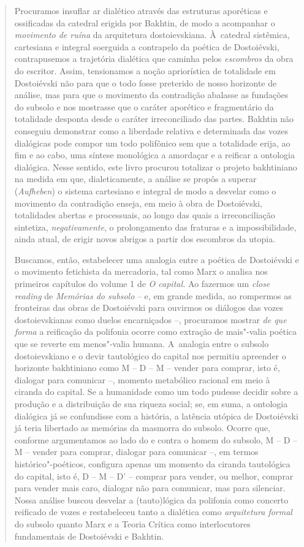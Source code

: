{\begin{quote}
Procuramos insuflar ar dialético através das estruturas aporéticas e
ossificadas da catedral erigida por Bakhtin, de modo a acompanhar o
\emph{movimento de ruína} da arquitetura dostoievskiana. À~catedral
sistêmica, cartesiana e integral soerguida a contrapelo da poética de
Dostoiévski, contrapusemos a trajetória dialética que caminha pelos
\emph{escombros} da obra do escritor. Assim, tensionamos a noção
apriorística de totalidade em Dostoiévski não para que o todo fosse
preterido de nosso horizonte de análise, mas para que o movimento da
contradição abalasse as fundações do subsolo e nos mostrasse que o
caráter aporético e fragmentário da totalidade desponta desde o caráter
irreconciliado das partes. Bakhtin não conseguiu demonstrar como a
liberdade relativa e determinada das vozes dialógicas pode compor um
todo polifônico sem que a totalidade erija, ao fim e ao cabo, uma
síntese monológica a amordaçar e a reificar a ontologia dialógica. Nesse
sentido, este livro procurou totalizar o projeto bakhtiniano na medida
em que, dialeticamente, a análise se propôs a superar (\emph{Aufheben})
o sistema cartesiano e integral de modo a desvelar como o movimento da
contradição enseja, em meio à obra de Dostoiévski, totalidades abertas e
processuais, ao longo das quais a irreconciliação sintetiza,
\emph{negativamente}, o prolongamento das fraturas e a impossibilidade,
ainda atual, de erigir novos abrigos a partir dos escombros da utopia.

Buscamos, então, estabelecer uma analogia entre a poética de Dostoiévski
e o movimento fetichista da mercadoria, tal como Marx o analisa nos
primeiros capítulos do volume 1 de \emph{O capital.} Ao fazermos um
\emph{close reading} de \emph{Memórias do subsolo} -- e, em grande
medida, ao rompermos as fronteiras das obras de Dostoiévski para
ouvirmos os diálogos das vozes dostoievskianas como duelos encarniçados
--, procuramos mostrar \emph{de que forma} a reificação da polifonia
ocorre como extração de mais"-valia poética que se reverte em menos"-valia
humana. A~analogia entre o subsolo dostoievskiano e o devir tautológico
do capital nos permitiu apreender o horizonte bakhtiniano como M -- D --
M -- vender para comprar, isto é, dialogar para comunicar --, momento
metabólico racional em meio à ciranda do capital. Se a humanidade como
um todo pudesse decidir sobre a produção e a distribuição de sua riqueza
social; se, em suma, a ontologia dialógica já se confundisse com a
história, a latência utópica de Dostoiévski já teria libertado as
memórias da masmorra do subsolo. Ocorre que, conforme argumentamos ao
lado do e contra o homem do subsolo, M -- D -- M -- vender para comprar,
dialogar para comunicar --, em termos histórico"-poéticos, configura
apenas um momento da ciranda tautológica do capital, isto é, D -- M --
D' -- comprar para vender, ou melhor, comprar para vender mais caro,
dialogar não para comunicar, mas para silenciar. Nossa análise buscou
desvelar a (tauto)lógica da polifonia como concerto reificado de vozes e
restabeleceu tanto a dialética como \emph{arquitetura formal} do subsolo
quanto Marx e a Teoria Crítica como interlocutores fundamentais de
Dostoiévski e Bakhtin.


\end{quote}}
